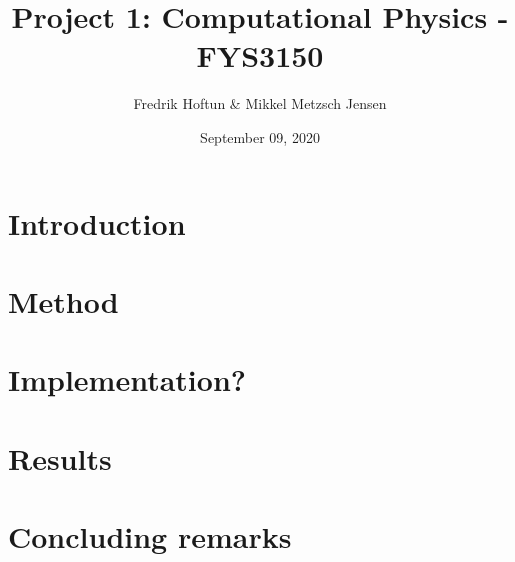 \documentclass[american,a4paper,12pt]{article}
\title{Project 1: Computational Physics - FYS3150}
\author{Fredrik Hoftun \& Mikkel Metzsch Jensen}
\date{September 09, 2020}
\begin{document}
\maketitle

\section{Introduction}
\section{Method}
\section{Implementation?}
\section{Results}
\section{Concluding remarks}
\end{document}
